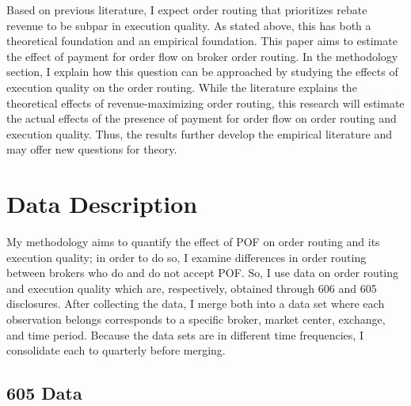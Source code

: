 \documentclass[12pt,a4paper]{extarticle}
\begin{document}
Based on previous literature, I expect order routing that prioritizes rebate revenue to be subpar in execution quality. As stated above, this has both a theoretical foundation and an empirical foundation. This paper aims to estimate the effect of payment for order flow on broker order routing. In the methodology section, I explain how this question can be approached by studying the effects of execution quality on the order routing. While the literature explains the theoretical effects of revenue-maximizing order routing, this research will estimate the actual effects of the presence of payment for order flow on order routing and execution quality. Thus, the results further develop the empirical literature and may offer new questions for theory. 






	
	
\section{Data Description}

	My methodology aims to quantify the effect of POF on order routing and its execution quality; in order to do so, I examine differences in order routing between brokers who do and do not accept POF. So, I use data on order routing and execution quality which are, respectively, obtained through 606 and 605 disclosures.  After collecting the data, I merge both into a data set where each observation belongs corresponds to a specific broker, market center, exchange, and time period. Because the data sets are in different time frequencies, I consolidate each to quarterly before merging. 
	
	\subsection{605 Data}
	
	
\end{document}
